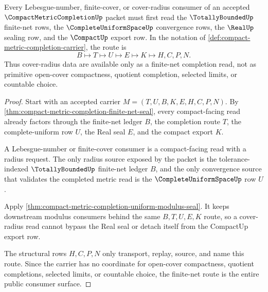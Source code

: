\begin{theorem}
\label{thm:compact-metric-completion-lebesgue-number-consumer-route}
Every Lebesgue-number, finite-cover, or cover-radius consumer of an accepted $\CompactMetricCompletionUp$ packet must first read the $\TotallyBoundedUp$ finite-net rows, the $\CompleteUniformSpaceUp$ convergence rows, the $\RealUp$ sealing row, and the $\CompactUp$ export row. In the notation of \autoref{def:compact-metric-completion-carrier}, the route is
$$
B \longmapsto T \longmapsto U \longmapsto E \longmapsto K \longmapsto H,C,P,N .
$$
Thus cover-radius data are available only as a finite-net completion read, not as primitive open-cover compactness, quotient completion, selected limits, or countable choice.
\end{theorem}
\begin{proof}
Start with an accepted carrier $M=(T,U,B,K,E,H,C,P,N)$. By \autoref{thm:compact-metric-completion-finite-net-seal}, every compact-facing read already factors through the finite-net ledger $B$, the completion route $T$, the complete-uniform row $U$, the Real seal $E$, and the compact export $K$.

A Lebesgue-number or finite-cover consumer is a compact-facing read with a radius request. The only radius source exposed by the packet is the tolerance-indexed $\TotallyBoundedUp$ finite-net ledger $B$, and the only convergence source that validates the completed metric read is the $\CompleteUniformSpaceUp$ row $U$.

Apply \autoref{thm:compact-metric-completion-uniform-modulus-seal}. It keeps downstream modulus consumers behind the same $B,T,U,E,K$ route, so a cover-radius read cannot bypass the Real seal or detach itself from the CompactUp export row.

The structural rows $H,C,P,N$ only transport, replay, source, and name this route. Since the carrier has no coordinate for open-cover compactness, quotient completions, selected limits, or countable choice, the finite-net route is the entire public consumer surface.
\end{proof}


